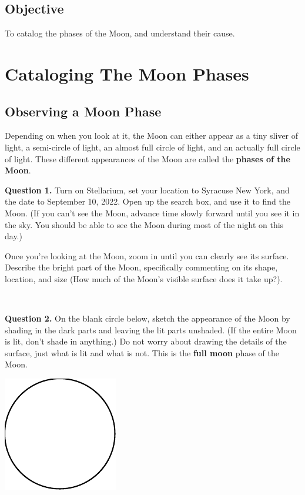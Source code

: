 \documentclass[11pt]{article}
\begin{document}
\subsection*{Objective}

To catalog the phases of the Moon, and understand their cause.

\newpage

\section{Cataloging The Moon Phases}

\subsection{Observing a Moon Phase}

Depending on when you look at it, the Moon can either appear as a tiny sliver of light, a semi-circle of light, an almost full circle of light, and an actually full circle of light. These different appearances of the Moon are called the \textbf{phases of the Moon}.

\noindent
\textbf{Question 1.} Turn on Stellarium, set your location to Syracuse New York, and the date to September 10, 2022. Open up the search box, and use it to find the Moon. (If you can't see the Moon, advance time slowly forward until you see it in the sky. You should be able to see the Moon during most of the night on this day.)

Once you're looking at the Moon, zoom in until you can clearly see its surface.\\

Describe the bright part of the Moon, specifically commenting on its shape, location, and size (How much of the Moon's visible surface does it take up?).\\
\vspace*{1.5cm}

\hrulefill\\
\noindent

\textbf{Question 2.} On the blank circle below, sketch the appearance of the Moon by shading in the dark parts and leaving the lit parts unshaded. (If the entire Moon is lit, don't shade in anything.) Do not worry about drawing the details of the surface, just what is lit and what is not. This is the \textbf{full moon} phase of the Moon.\\
\begin{center}
	\includegraphics{blank_moon}
\end{center}
\end{document}
